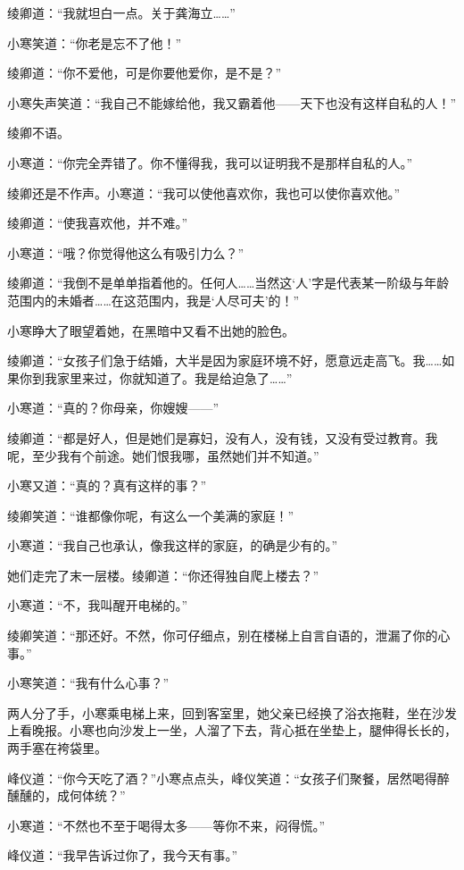 \par 绫卿道：“我就坦白一点。关于龚海立……”
\par 小寒笑道：“你老是忘不了他！”
\par 绫卿道：“你不爱他，可是你要他爱你，是不是？”
\par 小寒失声笑道：“我自己不能嫁给他，我又霸着他——天下也没有这样自私的人！”
\par 绫卿不语。
\par 小寒道：“你完全弄错了。你不懂得我，我可以证明我不是那样自私的人。”
\par 绫卿还是不作声。小寒道：“我可以使他喜欢你，我也可以使你喜欢他。”
\par 绫卿道：“使我喜欢他，并不难。”
\par 小寒道：“哦？你觉得他这么有吸引力么？”
\par 绫卿道：“我倒不是单单指着他的。任何人……当然这‘人’字是代表某一阶级与年龄范围内的未婚者……在这范围内，我是‘人尽可夫’的！”
\par 小寒睁大了眼望着她，在黑暗中又看不出她的脸色。
\par 绫卿道：“女孩子们急于结婚，大半是因为家庭环境不好，愿意远走高飞。我……如果你到我家里来过，你就知道了。我是给迫急了……”
\par 小寒道：“真的？你母亲，你嫂嫂——”
\par 绫卿道：“都是好人，但是她们是寡妇，没有人，没有钱，又没有受过教育。我呢，至少我有个前途。她们恨我哪，虽然她们并不知道。”
\par 小寒又道：“真的？真有这样的事？”
\par 绫卿笑道：“谁都像你呢，有这么一个美满的家庭！”
\par 小寒道：“我自己也承认，像我这样的家庭，的确是少有的。”
\par 她们走完了末一层楼。绫卿道：“你还得独自爬上楼去？”
\par 小寒道：“不，我叫醒开电梯的。”
\par 绫卿笑道：“那还好。不然，你可仔细点，别在楼梯上自言自语的，泄漏了你的心事。”
\par 小寒笑道：“我有什么心事？”
\par 两人分了手，小寒乘电梯上来，回到客室里，她父亲已经换了浴衣拖鞋，坐在沙发上看晚报。小寒也向沙发上一坐，人溜了下去，背心抵在坐垫上，腿伸得长长的，两手塞在袴袋里。
\par 峰仪道：“你今天吃了酒？”小寒点点头，峰仪笑道：“女孩子们聚餐，居然喝得醉醺醺的，成何体统？”
\par 小寒道：“不然也不至于喝得太多——等你不来，闷得慌。”
\par 峰仪道：“我早告诉过你了，我今天有事。”
